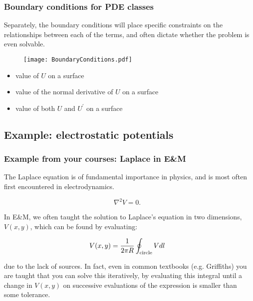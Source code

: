 \documentclass[hyperref={colorlinks=true}]{beamer}
\begin{document}

\begin{frame}%
  \frametitle{Boundary conditions for PDE classes}

  Separately, the boundary conditions will place specific constraints on the relationships between each of the terms, and often dictate whether the problem is even solvable.
  
  \begin{figure}
    \texttt{[image: BoundaryConditions.pdf]}
  \end{figure}
  
  \begin{itemize}
    \item {} value of $U$ on a surface
    \item {} value of the normal derivative of $U$ on a surface
    \item {} value of both $U$ and $U^{\prime}$ on a surface 
  \end{itemize}


\end{frame}



\subsection[Example: electrostatic potentials]{Example: electrostatic potentials}

\begin{frame}%
  \frametitle{Example from your courses: Laplace in E\&M}

  The Laplace equation is of fundamental importance in physics, and is most often first encountered in electrodynamics.

  \begin{equation}
    \nabla^{2} V = 0.
  \end{equation}

  In E\&M, we often taught the solution to Laplace's equation in two dimensions, $V(x,y)$, which can be found by evaluating:

  \begin{equation}
    V(x,y) = \frac{1}{2\pi R} \oint_{\rm circle} V dl
  \end{equation}
  
  due to the lack of sources. In fact, even in common textbooks (e.g. Griffiths) you are taught that you can solve this iteratively, by evaluating this integral until a change in $V(x,y)$ on successive evaluations of the expression is smaller than some tolerance. 
  
\end{frame}
\end{document}
